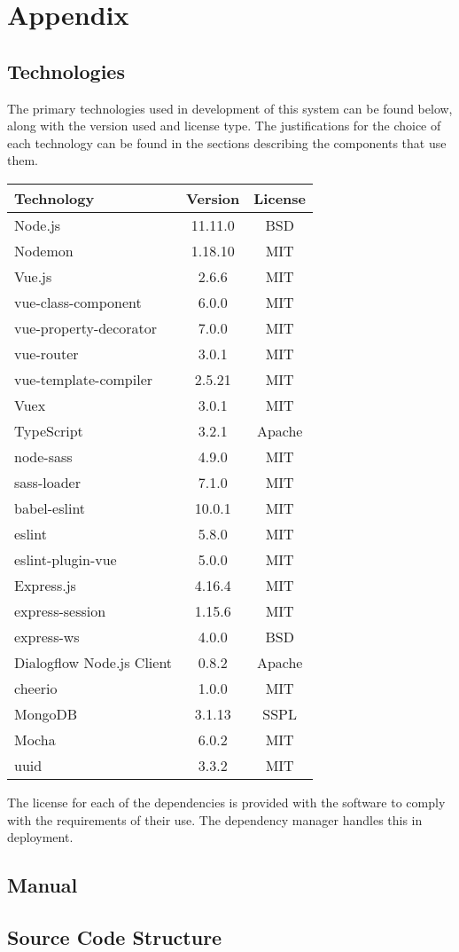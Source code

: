 \section{Appendix}

\subsection{Technologies}
The primary technologies used in development of this system can be found below, along with the version used and license type. The justifications for the choice of each technology can be found in the sections describing the components that use them.

\begin{center}
	\begin{tabular}{ | l | c | c | } 
		\hline
		\textbf{Technology} & \textbf{Version} & \textbf{License} \\ 
		\hline
		Node.js & 11.11.0 & BSD \\
		Nodemon & 1.18.10 & MIT \\
        Vue.js & 2.6.6 & MIT \\
        vue-class-component & 6.0.0 & MIT \\
        vue-property-decorator & 7.0.0 & MIT \\
        vue-router & 3.0.1 & MIT \\
        vue-template-compiler & 2.5.21 & MIT \\
        Vuex & 3.0.1 & MIT \\
        TypeScript & 3.2.1 & Apache \\
        node-sass & 4.9.0 & MIT \\
        sass-loader & 7.1.0 & MIT \\
        babel-eslint & 10.0.1 & MIT \\
        eslint & 5.8.0 & MIT \\
        eslint-plugin-vue & 5.0.0 & MIT \\
		Express.js & 4.16.4 & MIT \\
		express-session & 1.15.6 & MIT \\
		express-ws & 4.0.0 & BSD \\
		Dialogflow Node.js Client & 0.8.2 & Apache \\
        cheerio & 1.0.0 & MIT \\
		MongoDB & 3.1.13 & SSPL \\
		Mocha & 6.0.2 & MIT \\
		uuid & 3.3.2 & MIT \\
		\hline
	\end{tabular}
\end{center}

The license for each of the dependencies is provided with the software to comply with the requirements of their use. The dependency manager  handles this in deployment.

\subsection{Manual}

\subsection{Source Code Structure}
